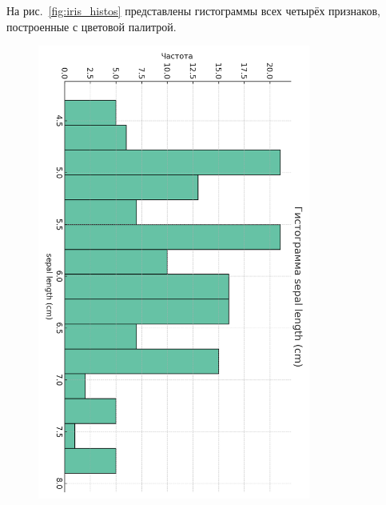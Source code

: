 На рис.~\ref{fig:iris_histos} представлены гистограммы всех четырёх признаков, построенные с цветовой палитрой.
\begin{figure}[H]
  \centering
  \includegraphics[width=0.8\textwidth]{images/histo_sepal_length_cm_cb2.png}\\[6pt]

\end{figure}

